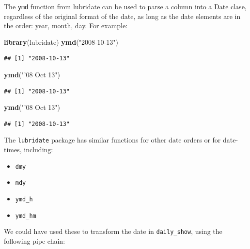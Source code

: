 \documentclass[]{book}
\makeatletter
\newenvironment{Shaded}{\begin{snugshade}}{\end{snugshade}}
\newcommand{\KeywordTok}[1]{\textcolor[rgb]{0.13,0.29,0.53}{\textbf{{#1}}}}
\newcommand{\StringTok}[1]{\textcolor[rgb]{0.31,0.60,0.02}{{#1}}}
\newcommand{\NormalTok}[1]{{#1}}
\providecommand{\tightlist}{%
  \setlength{\itemsep}{0pt}\setlength{\parskip}{0pt}}
\newenvironment{kframe}{%
\medskip{}
\setlength{\fboxsep}{.8em}
 \def\at@end@of@kframe{}%
 \ifinner\ifhmode%
  \def\at@end@of@kframe{\end{minipage}}%
  \begin{minipage}{\columnwidth}%
 \fi\fi%
 \def\FrameCommand##1{\hskip\@totalleftmargin \hskip-\fboxsep
 \colorbox{shadecolor}{##1}\hskip-\fboxsep
     \hskip-\linewidth \hskip-\@totalleftmargin \hskip\columnwidth}%
 \MakeFramed {\advance\hsize-\width
   \@totalleftmargin\z@ \linewidth\hsize
   \@setminipage}}%
 {\par\unskip\endMakeFramed%
 \at@end@of@kframe}
\renewenvironment{Shaded}{\begin{kframe}}{\end{kframe}}
\makeatother
\begin{document}
The \texttt{ymd} function from lubridate can be used to parse a column
into a Date clase, regardless of the original format of the date, as
long as the date elements are in the order: year, month, day. For
example:

\begin{Shaded}
\begin{Highlighting}[]
\KeywordTok{library}\NormalTok{(lubridate)}
\KeywordTok{ymd}\NormalTok{(}\StringTok{"2008-10-13"}\NormalTok{)}
\end{Highlighting}
\end{Shaded}

\begin{verbatim}
## [1] "2008-10-13"
\end{verbatim}

\begin{Shaded}
\begin{Highlighting}[]
\KeywordTok{ymd}\NormalTok{(}\StringTok{"'08 Oct 13"}\NormalTok{)}
\end{Highlighting}
\end{Shaded}

\begin{verbatim}
## [1] "2008-10-13"
\end{verbatim}

\begin{Shaded}
\begin{Highlighting}[]
\KeywordTok{ymd}\NormalTok{(}\StringTok{"'08 Oct 13"}\NormalTok{)}
\end{Highlighting}
\end{Shaded}

\begin{verbatim}
## [1] "2008-10-13"
\end{verbatim}

The \texttt{lubridate} package has similar functions for other date
orders or for date-times, including:

\begin{itemize}
\tightlist
\item
  \texttt{dmy}
\item
  \texttt{mdy}
\item
  \texttt{ymd\_h}
\item
  \texttt{ymd\_hm}
\end{itemize}

We could have used these to transform the date in \texttt{daily\_show},
using the following pipe chain:
\end{document}
